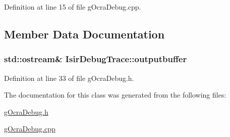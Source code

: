 Definition at line 15 of file g\+Ocra\+Debug.\+cpp.



\subsection{Member Data Documentation}
\subsubsection[{\texorpdfstring{outputbuffer}{outputbuffer}}]{\setlength{\rightskip}{0pt plus 5cm}std\+::ostream\& Isir\+Debug\+Trace\+::outputbuffer}\hypertarget{classIsirDebugTrace_aede1e58ef880d19d0203086232a6dd99}{}\label{classIsirDebugTrace_aede1e58ef880d19d0203086232a6dd99}


Definition at line 33 of file g\+Ocra\+Debug.\+h.



The documentation for this class was generated from the following files\+:\begin{DoxyCompactItemize}
\item 
\hyperlink{gOcraDebug_8h}{g\+Ocra\+Debug.\+h}\item 
\hyperlink{gOcraDebug_8cpp}{g\+Ocra\+Debug.\+cpp}\end{DoxyCompactItemize}
